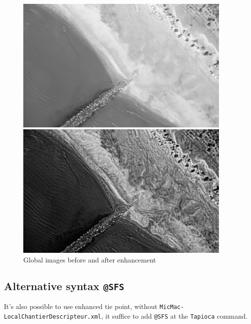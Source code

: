\begin{figure}
\begin{center}
\includegraphics[width=0.95\textwidth]{FIGS/Tapioca-SFS/Im-STD.jpg}

\includegraphics[width=0.95\textwidth]{FIGS/Tapioca-SFS/Im-SFS.jpg}
\end{center}
\caption{Global images before and after enhancement}
\label{FIG:SF:Img}
\end{figure}


\newpage

\subsection{Alternative syntax {\tt @SFS}}

It's also possible to use enhanced tie point, without {\tt MicMac-LocalChantierDescripteur.xml},
it suffice to add {\tt @SFS} at the {\tt Tapioca} command.


